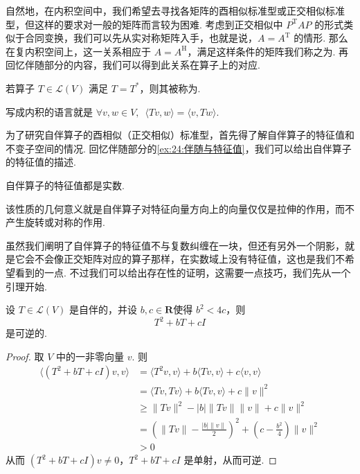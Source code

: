 自然地，在内积空间中，我们希望去寻找各矩阵的酉相似标准型或正交相似标准型，但这样的要求对一般的矩阵而言较为困难. 考虑到正交相似中 $ P^{\mathrm{T}}AP $ 的形式类似于合同变换，我们可以先从实对称矩阵入手，也就是说，$ A = A^{\mathrm{T}} $ 的情形. 那么在复内积空间上，这一关系相应于 $ A = A^{\mathrm{H}} $，满足这样条件的矩阵我们称之为. 再回忆伴随部分的内容，我们可以得到此关系在算子上的对应.

\begin{definition}[自伴算子] 
    若算子 $ T \in \mathcal{L}(V) $ 满足 $ T = T^* $，则其被称为.
\end{definition}

写成内积的语言就是 $ \forall v, w \in V,\enspace \langle Tv, w \rangle = \langle v, Tw \rangle $.

为了研究自伴算子的酉相似（正交相似）标准型，首先得了解自伴算子的特征值和不变子空间的情况. 回忆伴随部分的\autoref{ex:24:伴随与特征值}，我们可以给出自伴算子的特征值的描述.

\begin{theorem}
    自伴算子的特征值都是实数.
\end{theorem}

该性质的几何意义就是自伴算子对特征向量方向上的向量仅仅是拉伸的作用，而不产生旋转或对称的作用.

虽然我们阐明了自伴算子的特征值不与复数纠缠在一块，但还有另外一个阴影，就是它会不会像正交矩阵对应的算子那样，在实数域上没有特征值，这也是我们不希望看到的一点. 不过我们可以给出存在性的证明，这需要一点技巧，我们先从一个引理开始.

\begin{lemma} \label{lem:24:实谱定理引理1}
    设 $ T \in \mathcal{L}(V) $ 是自伴的，并设 $ b, c \in \mathbf{R} $使得 $ b^2 < 4c $，则
    \[ T^2 + bT + cI \]
    是可逆的.
\end{lemma}

\begin{proof}
    取 $ V $ 中的一非零向量 $ v $. 则
    \begin{align*}
        \langle(T^2+bT+cI)v,v\rangle & = \langle T^2v,v \rangle + b\langle Tv,v \rangle + c\langle v,v \rangle                                  \\
                                     & = \langle Tv,Tv \rangle + b\langle Tv,v \rangle + c\lVert v \rVert^2                                     \\
                                     & \geqslant \lVert Tv \rVert^2 - \lvert b \rvert \lVert Tv \rVert \lVert v \rVert +  c\lVert v \rVert^2    \\
                                     & = \left(\lVert Tv \rVert - \frac{|b| \lVert v \rVert}{2}\right)^2 + (c - \frac{b^2}{4})\lVert v \rVert^2 \\
                                     & > 0
    \end{align*}
    从而 $ (T^2 + bT + cI)v \neq 0 $，$ T^2 + bT + cI $ 是单射，从而可逆.
\end{proof}

